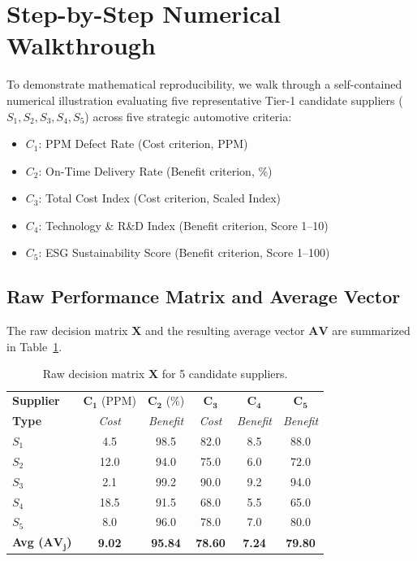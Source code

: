 \documentclass[twocolumn,10pt]{article}
\begin{document}
\section{Step-by-Step Numerical Walkthrough}
\label{sec:numerical_example}

To demonstrate mathematical reproducibility, we walk through a self-contained numerical illustration evaluating five representative Tier-1 candidate suppliers ($S_1, S_2, S_3, S_4, S_5$) across five strategic automotive criteria:
\begin{itemize}
    \item $C_1$: PPM Defect Rate (Cost criterion, PPM)
    \item $C_2$: On-Time Delivery Rate (Benefit criterion, \%)
    \item $C_3$: Total Cost Index (Cost criterion, Scaled Index)
    \item $C_4$: Technology \& R\&D Index (Benefit criterion, Score 1--10)
    \item $C_5$: ESG Sustainability Score (Benefit criterion, Score 1--100)
\end{itemize}

\subsection{Raw Performance Matrix and Average Vector}
The raw decision matrix $\mathbf{X}$ and the resulting average vector $\mathbf{AV}$ are summarized in Table~\ref{tab:numerical_raw}.

\begin{table}[h]
\centering
\caption{Raw decision matrix $\mathbf{X}$ for 5 candidate suppliers.}
\label{tab:numerical_raw}
\footnotesize
\begin{tabular}{lccccc}
\toprule
\textbf{Supplier} & $\mathbf{C_1}$ (PPM) & $\mathbf{C_2}$ (\%) & $\mathbf{C_3}$ & $\mathbf{C_4}$ & $\mathbf{C_5}$ \\
\textbf{Type} & \textit{Cost} & \textit{Benefit} & \textit{Cost} & \textit{Benefit} & \textit{Benefit} \\
\midrule
$S_1$ & 4.5  & 98.5 & 82.0 & 8.5 & 88.0 \\
$S_2$ & 12.0 & 94.0 & 75.0 & 6.0 & 72.0 \\
$S_3$ & 2.1  & 99.2 & 90.0 & 9.2 & 94.0 \\
$S_4$ & 18.5 & 91.5 & 68.0 & 5.5 & 65.0 \\
$S_5$ & 8.0  & 96.0 & 78.0 & 7.0 & 80.0 \\
\midrule
\textbf{Avg ($\mathbf{AV_j}$)} & \textbf{9.02} & \textbf{95.84} & \textbf{78.60} & \textbf{7.24} & \textbf{79.80} \\
\bottomrule
\end{tabular}
\end{table}
\end{document}
